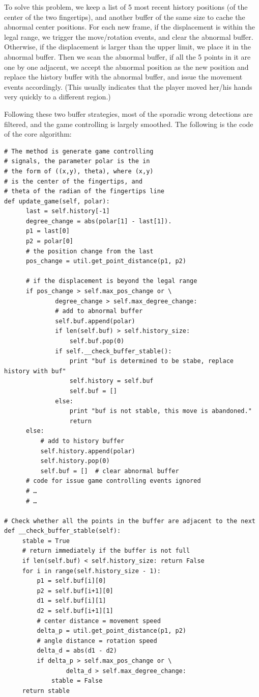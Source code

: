 \documentclass[10pt,twocolumn,letterpaper]{article}
\begin{document}
To solve this problem, we keep a list of 5 most recent history positions 
(of the center of the two fingertips), and another buffer of the same size 
to cache the abnormal center positions.  For each new frame, if the displacement 
is within the legal range, we trigger the move/rotation events, 
and clear the abnormal buffer. Otherwise, if the displacement is larger than 
the upper limit, we place it in the abnormal buffer. Then we scan the abnormal 
buffer, if all the 5 points in it are one by one adjacent, we accept the abnormal 
position as the new position and replace the history buffer with the abnormal 
buffer, and issue the movement events accordingly. (This usually 
indicates that the player moved her/his hands very quickly to a different region.)

Following these two buffer strategies, most of the sporadic wrong detections are 
filtered, and the game controlling is largely smoothed. The following is the 
code of the core algorithm:

{\tiny{
\begin{verbatim}
# The method is generate game controlling 
# signals, the parameter polar is the in 
# the form of ((x,y), theta), where (x,y) 
# is the center of the fingertips, and 
# theta of the radian of the fingertips line
def update_game(self, polar):
      last = self.history[-1]
      degree_change = abs(polar[1] - last[1]).
      p1 = last[0]
      p2 = polar[0]
      # the position change from the last
      pos_change = util.get_point_distance(p1, p2)

      # if the displacement is beyond the legal range
      if pos_change > self.max_pos_change or \
              degree_change > self.max_degree_change: 
              # add to abnormal buffer
              self.buf.append(polar)
              if len(self.buf) > self.history_size:
                  self.buf.pop(0) 
              if self.__check_buffer_stable():
                  print "buf is determined to be stabe, replace history with buf"
                  self.history = self.buf
                  self.buf = []
              else:
                  print "buf is not stable, this move is abandoned."
                  return
      else:
          # add to history buffer
          self.history.append(polar)
          self.history.pop(0)
          self.buf = []  # clear abnormal buffer
      # code for issue game controlling events ignored
      # …
      # …

# Check whether all the points in the buffer are adjacent to the next
def __check_buffer_stable(self):
     stable = True
     # return immediately if the buffer is not full
     if len(self.buf) < self.history_size: return False 
     for i in range(self.history_size - 1):
         p1 = self.buf[i][0]
         p2 = self.buf[i+1][0]
         d1 = self.buf[i][1]
         d2 = self.buf[i+1][1]
         # center distance = movement speed
         delta_p = util.get_point_distance(p1, p2) 
         # angle distance = rotation speed
         delta_d = abs(d1 - d2)   
         if delta_p > self.max_pos_change or \
                 delta_d > self.max_degree_change:
             stable = False
     return stable
\end{verbatim}
}}
\end{document}
